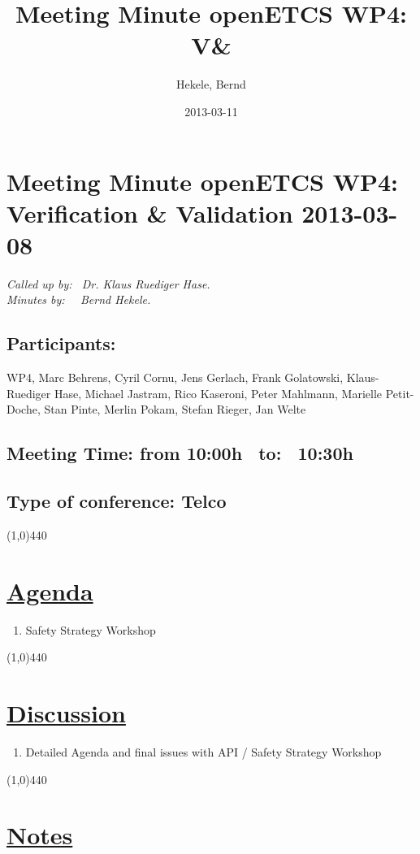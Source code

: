 \documentclass[a4paper]{article}
\title{Meeting Minute openETCS WP4: V&\V}
\author{Hekele, Bernd}
\date{2013-03-11}
\begin{document}
\section*{\large{Meeting Minute openETCS WP4: Verification \& Validation 2013-03-08}}

\emph{Called up by: \ Dr. Klaus Ruediger Hase.}\\
\emph{Minutes by: \ \  Bernd Hekele.}


\subsection*{Participants:} WP4, 
Marc Behrens, 
Cyril Cornu, 
Jens Gerlach, 
Frank Golatowski, 
Klaus-Ruediger Hase, 
Michael Jastram, 
Rico Kaseroni, 
Peter Mahlmann, 
Marielle Petit-Doche, 
Stan Pinte, 
Merlin Pokam, 
Stefan Rieger, 
Jan Welte\\


\subsection*{Meeting Time: from 10:00h \ to: \ 10:30h}

\subsection*{Type of conference: Telco}

\line(1,0){440}
\section*{\underline{Agenda}}
\begin{enumerate}
\item Safety Strategy Workshop
\end{enumerate}
\line(1,0){440}
\section*{\underline{Discussion}}

\begin{enumerate}

\item Detailed Agenda and final issues with API / Safety Strategy Workshop\newline

\end{enumerate}

\line(1,0){440}
\section*{\underline{Notes}}
\end{document}
